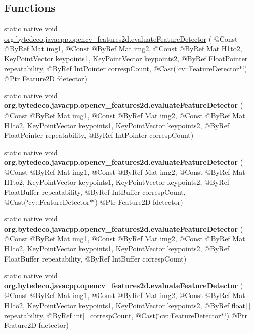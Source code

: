 \subsection*{Functions}
\begin{DoxyCompactItemize}
\item 
static native void \hyperlink{group__features2d_gaae7a705a66cbdd0ed99122fe183a0e03}{org.\+bytedeco.\+javacpp.\+opencv\+\_\+features2d.\+evaluate\+Feature\+Detector} ( @Const @By\+Ref Mat img1, @Const @By\+Ref Mat img2, @Const @By\+Ref Mat H1to2, Key\+Point\+Vector keypoints1, Key\+Point\+Vector keypoints2, @By\+Ref Float\+Pointer repeatability, @By\+Ref Int\+Pointer corresp\+Count, @Cast(\char`\"{}cv\+::\+Feature\+Detector$\ast$\char`\"{}) @Ptr Feature2D fdetector)
\item 
\mbox{\label{group__features2d_gaf598582f1ca50030005c9b845421d8be}} 
static native void {\bfseries org.\+bytedeco.\+javacpp.\+opencv\+\_\+features2d.\+evaluate\+Feature\+Detector} ( @Const @By\+Ref Mat img1, @Const @By\+Ref Mat img2, @Const @By\+Ref Mat H1to2, Key\+Point\+Vector keypoints1, Key\+Point\+Vector keypoints2, @By\+Ref Float\+Pointer repeatability, @By\+Ref Int\+Pointer corresp\+Count)
\item 
\mbox{\label{group__features2d_gac21f8a8809949cfd0cdd35759c85f183}} 
static native void {\bfseries org.\+bytedeco.\+javacpp.\+opencv\+\_\+features2d.\+evaluate\+Feature\+Detector} ( @Const @By\+Ref Mat img1, @Const @By\+Ref Mat img2, @Const @By\+Ref Mat H1to2, Key\+Point\+Vector keypoints1, Key\+Point\+Vector keypoints2, @By\+Ref Float\+Buffer repeatability, @By\+Ref Int\+Buffer corresp\+Count, @Cast(\char`\"{}cv\+::\+Feature\+Detector$\ast$\char`\"{}) @Ptr Feature2D fdetector)
\item 
\mbox{\label{group__features2d_ga5606fe8a99975588d8dd5148cf8ef90e}} 
static native void {\bfseries org.\+bytedeco.\+javacpp.\+opencv\+\_\+features2d.\+evaluate\+Feature\+Detector} ( @Const @By\+Ref Mat img1, @Const @By\+Ref Mat img2, @Const @By\+Ref Mat H1to2, Key\+Point\+Vector keypoints1, Key\+Point\+Vector keypoints2, @By\+Ref Float\+Buffer repeatability, @By\+Ref Int\+Buffer corresp\+Count)
\item 
\mbox{\label{group__features2d_ga85783088824e7c07c9496de97635fbcc}} 
static native void {\bfseries org.\+bytedeco.\+javacpp.\+opencv\+\_\+features2d.\+evaluate\+Feature\+Detector} ( @Const @By\+Ref Mat img1, @Const @By\+Ref Mat img2, @Const @By\+Ref Mat H1to2, Key\+Point\+Vector keypoints1, Key\+Point\+Vector keypoints2, @By\+Ref float\mbox{[}$\,$\mbox{]} repeatability, @By\+Ref int\mbox{[}$\,$\mbox{]} corresp\+Count, @Cast(\char`\"{}cv\+::\+Feature\+Detector$\ast$\char`\"{}) @Ptr Feature2D fdetector)

\end{DoxyCompactItemize}
